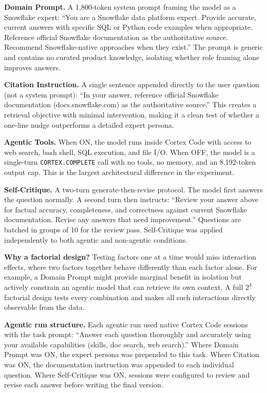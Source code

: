 \documentclass[10pt,letterpaper]{article}
\begin{document}
\textbf{Domain Prompt.} A 1,800-token system prompt framing the model as a Snowflake expert: ``You are a Snowflake data platform expert. Provide accurate, current answers with specific SQL or Python code examples when appropriate. Reference official Snowflake documentation as the authoritative source. Recommend Snowflake-native approaches when they exist.'' The prompt is generic and contains no curated product knowledge, isolating whether role framing alone improves answers.

\textbf{Citation Instruction.} A single sentence appended directly to the user question (not a system prompt): ``In your answer, reference official Snowflake documentation (docs.snowflake.com) as the authoritative source.'' This creates a retrieval objective with minimal intervention, making it a clean test of whether a one-line nudge outperforms a detailed expert persona.

\textbf{Agentic Tools.} When ON, the model runs inside Cortex Code with access to web search, bash shell, SQL execution, and file I/O. When OFF, the model is a single-turn \texttt{CORTEX.COMPLETE} call with no tools, no memory, and an 8,192-token output cap. This is the largest architectural difference in the experiment.

\textbf{Self-Critique.} A two-turn generate-then-revise protocol. The model first answers the question normally. A second turn then instructs: ``Review your answer above for factual accuracy, completeness, and correctness against current Snowflake documentation. Revise any answers that need improvement.'' Questions are batched in groups of 10 for the review pass. Self-Critique was applied independently to both agentic and non-agentic conditions.

\textbf{Why a factorial design?} Testing factors one at a time would miss interaction effects, where two factors together behave differently than each factor alone. For example, a Domain Prompt might provide marginal benefit in isolation but actively constrain an agentic model that can retrieve its own context. A full $2^4$ factorial design tests every combination and makes all such interactions directly observable from the data.

\textbf{Agentic run structure.} Each agentic run used native Cortex Code sessions with the task prompt: ``Answer each question thoroughly and accurately using your available capabilities (skills, doc search, web search).'' Where Domain Prompt was ON, the expert persona was prepended to this task. Where Citation was ON, the documentation instruction was appended to each individual question. Where Self-Critique was ON, sessions were configured to review and revise each answer before writing the final version.
\end{document}
